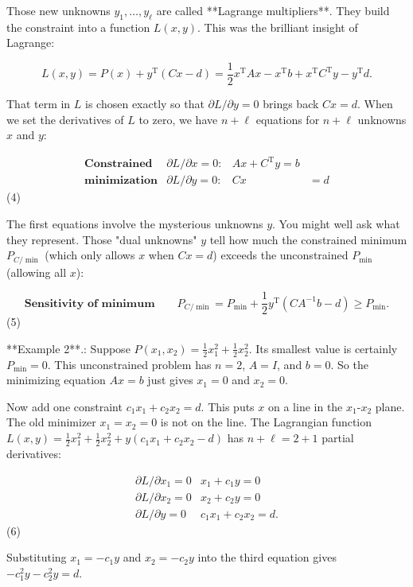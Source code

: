 Those new unknowns \(y_{1},\dots,y_{\ell}\) are called **Lagrange multipliers**. They build the constraint into a function \(L(x,y)\). This was the brilliant insight of Lagrange:

\[L(x,y)=P(x)+y^{\mathrm{T}}(Cx-d)=\frac{1}{2}x^{\mathrm{T}}Ax-x^{\mathrm{T}}b+x^ {\mathrm{T}}C^{\mathrm{T}}y-y^{\mathrm{T}}d.\]

That term in \(L\) is chosen exactly so that \(\partial L/\partial y=0\) brings back \(Cx=d\). When we set the derivatives of \(L\) to zero, we have \(n+\ell\) equations for \(n+\ell\) unknowns \(x\) and \(y\):

\[\begin{array}{llll}\textbf{Constrained}&\partial L/\partial x=0:&Ax+C^{ \mathrm{T}}y=b\\ \textbf{minimization}&\partial L/\partial y=0:&Cx&=d\end{array}\] (4)

The first equations involve the mysterious unknowns \(y\). You might well ask what they represent. Those "dual unknowns" \(y\) tell how much the constrained minimum \(P_{C/\min}\) (which only allows \(x\) when \(Cx=d\)) exceeds the unconstrained \(P_{\min}\) (allowing all \(x\)):

\[\textbf{Sensitivity of minimum}\qquad P_{C/\min}=P_{\min}+\frac{1}{2}y^{\mathrm{T}}( CA^{-1}b-d)\geq P_{\min}.\] (5)

**Example 2**.: Suppose \(P(x_{1},x_{2})=\frac{1}{2}x_{1}^{2}+\frac{1}{2}x_{2}^{2}\). Its smallest value is certainly \(P_{\min}=0\). This unconstrained problem has \(n=2\), \(A=I\), and \(b=0\). So the minimizing equation \(Ax=b\) just gives \(x_{1}=0\) and \(x_{2}=0\).

Now add one constraint \(c_{1}x_{1}+c_{2}x_{2}=d\). This puts \(x\) on a line in the \(x_{1}\)-\(x_{2}\) plane. The old minimizer \(x_{1}=x_{2}=0\) is not on the line. The Lagrangian function \(L(x,y)=\frac{1}{2}x_{1}^{2}+\frac{1}{2}x_{2}^{2}+y(c_{1}x_{1}+c_{2}x_{2}-d)\) has \(n+\ell=2+1\) partial derivatives:

\[\begin{array}{llll}\partial L/\partial x_{1}=0&x_{1}+c_{1}y=0\\ \partial L/\partial x_{2}=0&x_{2}+c_{2}y=0\\ \partial L/\partial y=0&c_{1}x_{1}+c_{2}x_{2}=d.\end{array}\] (6)

Substituting \(x_{1}=-c_{1}y\) and \(x_{2}=-c_{2}y\) into the third equation gives \(-c_{1}^{2}y-c_{2}^{2}y=d\).

